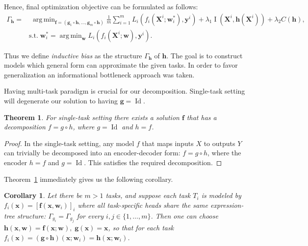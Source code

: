 \documentclass[14pt]{extarticle}
\newtheorem{theorem}{Theorem}[section]
\newtheorem{corollary}{Corollary}[theorem]
\DeclareMathOperator*{\argmin}{arg\,min}
\begin{document}
        Hence, final optimization objective can be formulated as follows:
        \begin{align}
            \Gamma_{\mathbf{h}} = &\; \argmin_{\mathbf{f} = (\mathbf{g}_1 \circ \mathbf{h}, \dots, \mathbf{g}_m \circ \mathbf{h})} 
            \frac{1}{m} \sum_{i=1}^m L_i(f_i(\mathbf{X}^i; \mathbf{w}^*_i), \mathbf{y}^i) + \lambda_1\operatorname{I}(\mathbf{X}^i, \mathbf{h}(\mathbf{X}^i))+ \lambda_2C(\mathbf{h}),\\ 
            & \text{s.t.} \; 
            \mathbf{w}^*_i = \argmin_{\mathbf{w}} L_i(f_i(\mathbf{X}^i; \mathbf{w}), \mathbf{y}^i).
        \end{align}
        
        Thus we define \textit{inductive bias} as the structure \(\Gamma_\mathbf{h}\) of \(\mathbf{h}\). The goal is to construct models which general form can approximate the given tasks. In order to favor generalization an informational bottleneck approach was taken. 

        Having multi-task paradigm is crucial for our decomposition. Single-task setting will degenerate our solution to having \(\mathbf{g}=\operatorname{Id}\). 
        \begin{theorem}\label{single_task}
            For single-task setting there exists a solution \(\mathbf{f}\) that has a decomposition \(f = g \circ h\), where \(g = \operatorname{Id}\) and \(h = f\).
        \end{theorem}
        \begin{proof}
            In the single-task setting, any model \(f\) that maps inputs \(X\) to outputs \(Y\) can trivially be decomposed into an encoder-decoder form: \(f = g \circ h\), where the encoder \(h = f\) and \(g = \operatorname{Id}\). This satisfies the required decomposition.
        \end{proof}
        Theorem~\ref{single_task} immediately gives us the following corollary.
        \begin{corollary}
            Let there be \(m > 1\) tasks, and suppose each task \(T_i\) is modeled by \(f_i(\mathbf{x}) = \left[ \mathbf{f}(\mathbf{x}, \mathbf{w}_i)\right]_i\) where all task-specific heads share the same expression-tree structure: \(\Gamma_{g_i} = \Gamma_{g_j}\) for every \(i, j \in \{1, \dots, m\}\). Then one can choose \(\mathbf{h}(\mathbf{x}, \mathbf{w}) = \mathbf{f}(\mathbf{x}; \mathbf{w}), \; \mathbf{g}(\mathbf{x}) = \mathbf{x}\), so that for each task \(f_i(\mathbf{x}) = (\mathbf{g} \circ \mathbf{h})(\mathbf{x}; \mathbf{w}_i) = \mathbf{h}(\mathbf{x}; \mathbf{w}_i)\).
        \end{corollary}
\newpage
\end{document}
